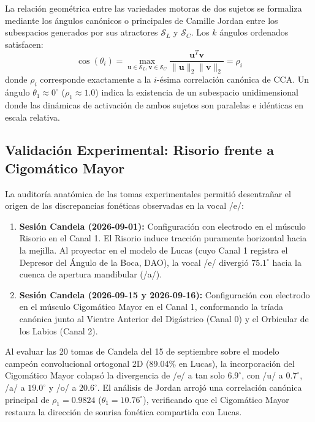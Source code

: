 \documentclass[11pt,a4paper]{article}
\begin{document}
La relación geométrica entre las variedades motoras de dos sujetos se formaliza mediante los ángulos canónicos o principales de Camille Jordan entre los subespacios generados por sus atractores $\mathcal{S}_L$ y $\mathcal{S}_C$. Los $k$ ángulos ordenados satisfacen:
\begin{equation}
    \cos(\theta_i) = \max_{\mathbf{u} \in \mathcal{S}_L, \mathbf{v} \in \mathcal{S}_C} \frac{\mathbf{u}^T \mathbf{v}}{\|\mathbf{u}\|_2 \|\mathbf{v}\|_2} = \rho_i
    \label{eq:jordan_angles}
\end{equation}
donde $\rho_i$ corresponde exactamente a la $i$-ésima correlación canónica de CCA. Un ángulo $\theta_1 \approx 0^\circ$ ($\rho_1 \approx 1.0$) indica la existencia de un subespacio unidimensional donde las dinámicas de activación de ambos sujetos son paralelas e idénticas en escala relativa.

\subsection{Validación Experimental: Risorio frente a Cigomático Mayor}
\label{subsec:validacion_cigomatico}

La auditoría anatómica de las tomas experimentales permitió desentrañar el origen de las discrepancias fonéticas observadas en la vocal /e/:
\begin{enumerate}
    \item \textbf{Sesión Candela (2026-09-01):} Configuración con electrodo en el músculo Risorio en el Canal 1. El Risorio induce tracción puramente horizontal hacia la mejilla. Al proyectar en el modelo de Lucas (cuyo Canal 1 registra el Depresor del Ángulo de la Boca, DAO), la vocal /e/ divergió $75.1^\circ$ hacia la cuenca de apertura mandibular (/a/).
    \item \textbf{Sesión Candela (2026-09-15 y 2026-09-16):} Configuración con electrodo en el músculo Cigomático Mayor en el Canal 1, conformando la tríada canónica junto al Vientre Anterior del Digástrico (Canal 0) y el Orbicular de los Labios (Canal 2).
\end{enumerate}

Al evaluar las 20 tomas de Candela del 15 de septiembre sobre el modelo campeón convolucional ortogonal 2D (89.04\% en Lucas), la incorporación del Cigomático Mayor colapsó la divergencia de /e/ a tan solo $6.9^\circ$, con /u/ a $0.7^\circ$, /a/ a $19.0^\circ$ y /o/ a $20.6^\circ$. El análisis de Jordan arrojó una correlación canónica principal de $\rho_1 = 0.9824$ ($\theta_1 = 10.76^\circ$), verificando que el Cigomático Mayor restaura la dirección de sonrisa fonética compartida con Lucas.
\end{document}
